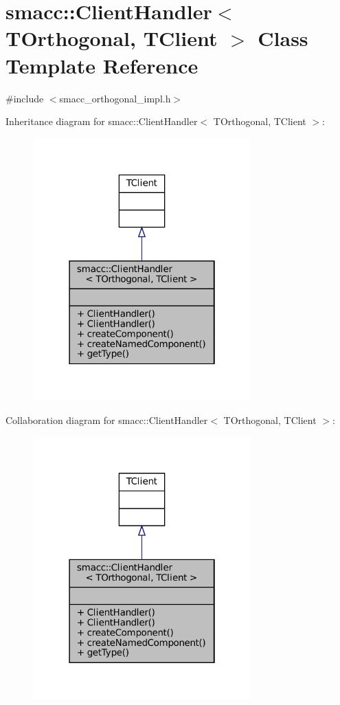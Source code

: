 \hypertarget{classsmacc_1_1ClientHandler}{}\section{smacc\+:\+:Client\+Handler$<$ T\+Orthogonal, T\+Client $>$ Class Template Reference}
\label{classsmacc_1_1ClientHandler}


{\ttfamily \#include $<$smacc\+\_\+orthogonal\+\_\+impl.\+h$>$}



Inheritance diagram for smacc\+:\+:Client\+Handler$<$ T\+Orthogonal, T\+Client $>$\+:
\nopagebreak
\begin{figure}[H]
\begin{center}
\leavevmode
\includegraphics[width=238pt]{classsmacc_1_1ClientHandler__inherit__graph}
\end{center}
\end{figure}


Collaboration diagram for smacc\+:\+:Client\+Handler$<$ T\+Orthogonal, T\+Client $>$\+:
\nopagebreak
\begin{figure}[H]
\begin{center}
\leavevmode
\includegraphics[width=238pt]{classsmacc_1_1ClientHandler__coll__graph}
\end{center}
\end{figure}
